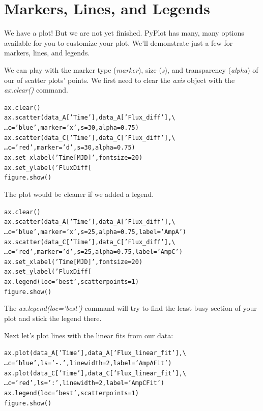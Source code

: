 \section{Markers, Lines, and Legends}\label{s:markers_lines_legends}  %

We have a plot! But we are not yet finished.
PyPlot has many, many options available for you to customize
your plot. We'll demonstrate just a few for markers, lines, and legends. 

We can play with the marker type (\textit{marker}), size (\textit{s}), and 
transparency (\textit{alpha}) of our of scatter plots' points. We first
need to clear the  \textit{axis} object with the \textit{ax.clear()} command.

\begin{alltt}
\pytab ax.clear()
\pytab ax.scatter(data_A['Time'], data_A['Flux_diff'], \textbackslash 
\ldots   c='blue', marker='x', s=30, alpha=0.75)
\pytab ax.scatter(data_C['Time'], data_C['Flux_diff'], \textbackslash 
\ldots   c='red', marker='d', s=30, alpha=0.75)
\pytab ax.set_xlabel('Time [MJD]', fontsize=20)
\pytab ax.set_ylabel('Flux Diff [%
\pytab figure.show()
\end{alltt}

The plot would be cleaner if we added a legend.

\begin{alltt}
\pytab ax.clear()
\pytab ax.scatter(data_A['Time'], data_A['Flux_diff'], \textbackslash 
\ldots   c='blue', marker='x', s=25, alpha=0.75, label='Amp A')
\pytab ax.scatter(data_C['Time'], data_C['Flux_diff'], \textbackslash 
\ldots   c='red', marker='d', s=25, alpha=0.75, label='Amp C')
\pytab ax.set_xlabel('Time [MJD]', fontsize=20)
\pytab ax.set_ylabel('Flux Diff [%
\pytab ax.legend(loc='best', scatterpoints=1)
\pytab figure.show()
\end{alltt}

The \textit{ax.legend(loc='best')} command will try to find the least busy section 
of your plot and stick the legend there. 

Next let's plot lines with the linear fits from our data:

\begin{alltt}
\pytab ax.plot(data_A['Time'], data_A['Flux_linear_fit'], \textbackslash 
\ldots  c='blue', ls='-.', linewidth=2, label='Amp A Fit')
\pytab ax.plot(data_C['Time'], data_C['Flux_linear_fit'], \textbackslash 
\ldots  c='red', ls=':', linewidth=2, label='Amp C Fit')
\pytab ax.legend(loc='best', scatterpoints=1)
\pytab figure.show()
\end{alltt}

